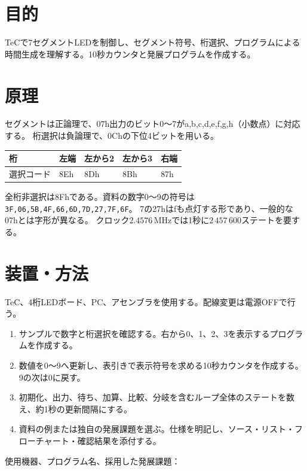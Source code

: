 \documentclass[lualatex,a4paper,10pt]{jlreq}
\begin{document}
\reporttitle
{}

\section{目的}\label{sec:auto1}
TeCで7セグメントLEDを制御し、セグメント符号、桁選択、プログラムによる時間生成を理解する。10秒カウンタと発展プログラムを作成する。
\section{原理}\label{sec:auto2}
セグメントは正論理で、07h出力のビット0〜7がa,b,c,d,e,f,g,h（小数点）に対応する。
桁選択は負論理で、0Chの下位4ビットを用いる。
\par\noindent\begin{tabularx}{\linewidth}{YYYYY}
\toprule 桁 & 左端 & 左から2 & 左から3 & 右端\\\midrule
選択コード &8Eh&8Dh&8Bh&87h\\\bottomrule
\end{tabularx}
全桁非選択は8Fhである。資料の数字0〜9の符号は
\texttt{3F,06,5B,4F,66,6D,7D,27,7F,6F}。
7の27hはfも点灯する形であり、一般的な07hとは字形が異なる。
クロック$2.4576\,\mathrm{MHz}$では1秒に$2\,457\,600$ステートを要する。
\section{装置・方法}\label{sec:auto3}
TeC、4桁LEDボード、PC、アセンブラを使用する。配線変更は電源OFFで行う。
\begin{enumerate}
\item サンプルで数字と桁選択を確認する。右から0、1、2、3を表示するプログラムを作成する。
\item 数値を0〜9へ更新し、表引きで表示符号を求める10秒カウンタを作成する。9の次は0に戻す。
\item 初期化、出力、待ち、加算、比較、分岐を含むループ全体のステートを数え、約1秒の更新間隔にする。
\item 資料の例または独自の発展課題を選ぶ。仕様を明記し、ソース・リスト・フローチャート・確認結果を添付する。
\end{enumerate}
使用機器、プログラム名、採用した発展課題：
\writing{18mm}
\clearpage
\end{document}
